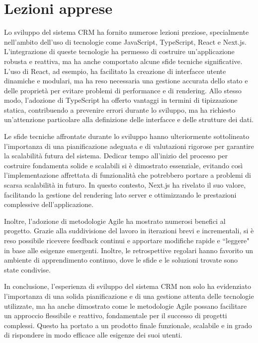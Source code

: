 \documentclass[target=bach,aauheader=,style=]{thud}
\begin{document}
\section{Lezioni apprese}
Lo sviluppo del sistema CRM ha fornito numerose lezioni preziose, specialmente nell'ambito dell'uso di tecnologie come JavaScript, TypeScript, React e Next.js. L'integrazione di queste tecnologie ha permesso di costruire un'applicazione robusta e reattiva, ma ha anche comportato alcune sfide tecniche significative. L'uso di React, ad esempio, ha facilitato la creazione di interfacce utente dinamiche e modulari, ma ha reso necessaria una gestione accurata dello stato e delle proprietà per evitare problemi di performance e di rendering. Allo stesso modo, l'adozione di TypeScript ha offerto vantaggi in termini di tipizzazione statica, contribuendo a prevenire errori durante lo sviluppo, ma ha richiesto un'attenzione particolare alla definizione delle interfacce e delle strutture dei dati.

\noindent Le sfide tecniche affrontate durante lo sviluppo hanno ulteriormente sottolineato l'importanza di una pianificazione adeguata e di valutazioni rigorose per garantire la scalabilità futura del sistema. Dedicar tempo all'inizio del processo per costruire fondamenta solide e scalabili si è dimostrato essenziale, evitando così l'implementazione affrettata di funzionalità che potrebbero portare a problemi di scarsa scalabilità in futuro. In questo contesto, Next.js ha rivelato il suo valore, facilitando la gestione del rendering lato server e ottimizzando le prestazioni complessive dell'applicazione.

\noindent Inoltre, l'adozione di metodologie Agile ha mostrato numerosi benefici al progetto. Grazie alla suddivisione del lavoro in iterazioni brevi e incrementali, si è reso possibile ricevere feedback continui e apportare modifiche rapide e ``leggere" in base alle esigenze emergenti. Inoltre, le retrospettive regolari hanno favorito un ambiente di apprendimento continuo, dove le sfide e le soluzioni trovate sono state condivise.

\noindent In conclusione, l'esperienza di sviluppo del sistema CRM non solo ha evidenziato l'importanza di una solida pianificazione e di una gestione attenta delle tecnologie utilizzate, ma ha anche dimostrato come le metodologie Agile possano facilitare un approccio flessibile e reattivo, fondamentale per il successo di progetti complessi. Questo ha portato a un prodotto finale funzionale, scalabile e in grado di rispondere in modo efficace alle esigenze dei suoi utenti.
\end{document}
